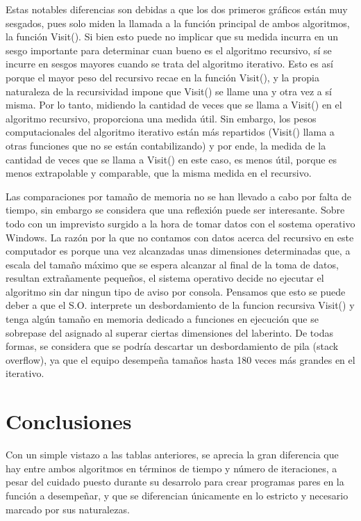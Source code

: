 \documentclass[12pt,a4paper]{article}
\begin{document}
Estas notables diferencias son debidas a que los dos primeros gráficos están muy sesgados, pues solo miden la llamada a la función principal de ambos algoritmos, la función Visit(). Si bien esto puede no implicar que su medida incurra en un sesgo importante para determinar cuan bueno es el algoritmo recursivo, sí se incurre en sesgos mayores cuando se trata del algoritmo iterativo. Esto es así porque el mayor peso del recursivo recae en la función Visit(), y la propia naturaleza de la recursividad impone que Visit() se llame una y otra vez a sí misma. Por lo tanto, midiendo la cantidad de veces que se llama a Visit() en el algoritmo recursivo, proporciona una medida útil. Sin embargo, los pesos computacionales del algoritmo iterativo están más repartidos (Visit() llama a otras funciones que no se están contabilizando) y por ende, la medida de la cantidad de veces que se llama a Visit() en este caso, es menos útil, porque es menos extrapolable y comparable, que la misma medida en el recursivo. 

Las comparaciones por tamaño de memoria no se han llevado a cabo por falta de tiempo, sin embargo se considera que una reflexión puede ser interesante. Sobre todo con un imprevisto surgido a la hora de tomar datos con el sostema operativo Windows. La razón por la que no contamos con datos acerca del recursivo en este computador es porque una vez alcanzadas unas dimensiones determinadas que, a escala del tamaño máximo que se espera alcanzar al final de la toma de datos, resultan extrañamente pequeños, el sistema operativo decide no ejecutar el algoritmo sin dar ningun tipo de aviso por consola. Pensamos que esto se puede deber a que el S.O. interprete un desbordamiento de la funcion recursiva Visit() y tenga algún tamaño en memoria dedicado a funciones en ejecución que se sobrepase del asignado al superar ciertas dimensiones del laberinto. De todas formas, se considera que se podría descartar un desbordamiento de pila (stack overflow), ya que el equipo desempeña tamaños hasta 180 veces más grandes en el iterativo. 

\clearpage
\section{Conclusiones}

Con un simple vistazo a las tablas anteriores, se aprecia la gran diferencia que hay entre ambos algoritmos en términos de tiempo y número de iteraciones, a pesar del cuidado puesto durante su desarrolo para crear programas pares en la función a desempeñar, y que se diferencian únicamente en lo estricto y necesario marcado por sus naturalezas. 
\end{document}
